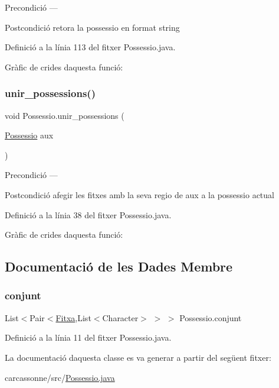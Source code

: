 \begin{DoxyPrecond}{Precondició}
--- 
\end{DoxyPrecond}
\begin{DoxyPostcond}{Postcondició}
retora la possessio en format string 
\end{DoxyPostcond}


Definició a la línia 113 del fitxer Possessio.\+java.

Gràfic de crides d\textquotesingle{}aquesta funció\+:
\mbox{\label{class_possessio_ac733be14dd5608eef86b00a5bce3a13f}} 
\subsubsection{\texorpdfstring{unir\+\_\+possessions()}{unir\_possessions()}}
{\footnotesize\ttfamily void Possessio.\+unir\+\_\+possessions (\begin{DoxyParamCaption}\item[{\mbox{\hyperlink{class_possessio}{Possessio}}}]{aux }\end{DoxyParamCaption})}

\begin{DoxyPrecond}{Precondició}
--- 
\end{DoxyPrecond}
\begin{DoxyPostcond}{Postcondició}
afegir les fitxes amb la seva regio de aux a la possessio actual 
\end{DoxyPostcond}


Definició a la línia 38 del fitxer Possessio.\+java.

Gràfic de crides d\textquotesingle{}aquesta funció\+:


\subsection{Documentació de les Dades Membre}
\mbox{\label{class_possessio_a4af748d6da87a5f1b68dbff47d84c4a3}} 
\subsubsection{\texorpdfstring{conjunt}{conjunt}}
{\footnotesize\ttfamily List$<$Pair$<$\mbox{\hyperlink{class_fitxa}{Fitxa}},List$<$Character$>$ $>$ $>$ Possessio.\+conjunt\hspace{0.3cm}{\ttfamily [private]}}



Definició a la línia 11 del fitxer Possessio.\+java.



La documentació d\textquotesingle{}aquesta classe es va generar a partir del següent fitxer\+:\begin{DoxyCompactItemize}
\item 
carcassonne/src/\mbox{\hyperlink{_possessio_8java}{Possessio.\+java}}\end{DoxyCompactItemize}

